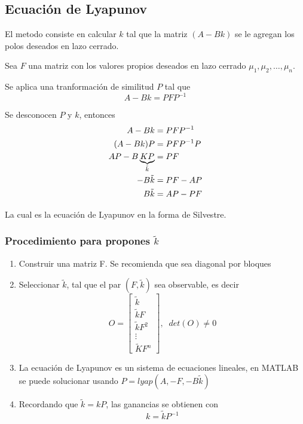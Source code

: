 \subsection{Ecuación de Lyapunov}
El metodo consiste en calcular \( k \) tal que la matriz \( (A-Bk) \) se le agregan los polos deseados en lazo cerrado. 

Sea \( F \) una matriz con los valores propios deseados en lazo cerrado \( \mu_{1}, \mu_{2}, \ldots, \mu_{n} \).

Se aplica una tranformación de similitud \( P \) tal que 
\[
    A-Bk = PFP^{-1}
\]

Se desconocen \( P \) y \( k \), entonces
\[
    \begin{split}
        A-Bk & = PFP^{-1} \\
        (A-Bk)P & = PFP^{-1}P \\
        AP - B\underbrace{KP}_{\Tilde{k}} & = PF\\
        -B\tilde{k} & = PF-AP\\
        B\tilde{k} & 
        = AP - PF
    \end{split}
\]

La cual es la ecuación de Lyapunov en la forma de Silvestre. 
\subsubsection{Procedimiento para propones \( \tilde{k} \)}

\begin{enumerate}
    \item Construir una matriz F. Se recomienda que sea diagonal por bloques
    \item Seleccionar \(\tilde{k}\), tal que el par \( (F, \tilde{k}) \) sea observable, es decir
        \[
            O = \begin{bmatrix}
                    \tilde{k} \\
                    \tilde{k}F \\
                    \tilde{k}F^{2} \\
                    \vdots \\
                    \tilde{K}F^{n}
                \end{bmatrix}, \;\;  det(O) \not= 0
        \]
    \item La ecuación de Lyapunov es un sistema de ecuaciones lineales, en MATLAB se puede solucionar usando \( P=lyap(A, -F, -B\tilde{k}) \)
    \item Recordando que \( \tilde{k} = kP \), las ganancias se obtienen con 
    \[
            k = \tilde{k}P^{-1}
    \]
\end{enumerate}

